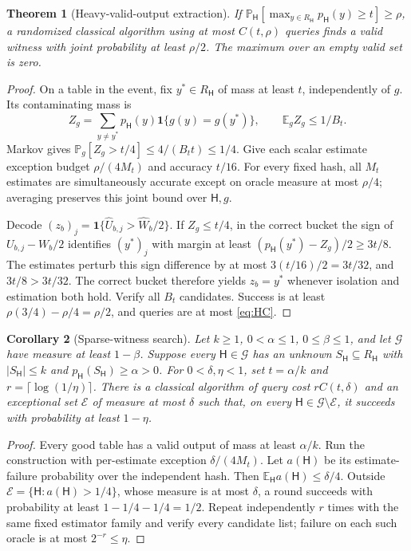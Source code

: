 \documentclass[11pt]{article}
\newtheorem{theorem}{Theorem}[section]
\newtheorem{corollary}[theorem]{Corollary}
\theoremstyle{definition}\newtheorem{definition}[theorem]{Definition}
\theoremstyle{remark}\newtheorem{remark}[theorem]{Remark}
\newcommand{\E}{\mathbb E}\newcommand{\Prb}{\mathbb P}
\newcommand{\mc}{\mathcal}\newcommand{\eps}{\varepsilon}
\begin{document}
\begin{theorem}[Heavy-valid-output extraction]\label{heavy}
If \(\Prb_{\mathsf H}[\max_{y\in R_{\mathsf H}}p_{\mathsf H}(y)\ge t]\ge\rho\), a randomized classical algorithm using at most \(C(t,\rho)\) queries finds a valid witness with joint probability at least \(\rho/2\). The maximum over an empty valid set is zero.
\end{theorem}
\begin{proof}
On a table in the event, fix \(y^*\in R_{\mathsf H}\) of mass at least \(t\), independently of \(g\). Its contaminating mass is
\[
 Z_g=\sum_{y\ne y^*}p_{\mathsf H}(y)\mathbf 1\{g(y)=g(y^*)\},\qquad\E_gZ_g\le1/B_t.
\]
Markov gives \(\Prb_g[Z_g>t/4]\le4/(B_tt)\le1/4\). Give each scalar estimate exception budget \(\rho/(4M_t)\) and accuracy \(t/16\). For every fixed hash, all \(M_t\) estimates are simultaneously accurate except on oracle measure at most \(\rho/4\); averaging preserves this joint bound over \(\mathsf H,g\).

Decode \((z_b)_j=\mathbf 1\{\widehat U_{b,j}>\widehat W_b/2\}\). If \(Z_g\le t/4\), in the correct bucket the sign of \(U_{b,j}-W_b/2\) identifies \((y^*)_j\) with margin at least \((p_{\mathsf H}(y^*)-Z_g)/2\ge3t/8\). The estimates perturb this sign difference by at most \(3(t/16)/2=3t/32\), and \(3t/8>3t/32\). The correct bucket therefore yields \(z_b=y^*\) whenever isolation and estimation both hold. Verify all \(B_t\) candidates. Success is at least \(\rho(3/4)-\rho/4=\rho/2\), and queries are at most \eqref{eq:HC}.
\end{proof}

\begin{corollary}[Sparse-witness search]
Let \(k\ge1\), \(0<\alpha\le1\), \(0\le\beta\le1\), and let \(\mc G\) have measure at least \(1-\beta\). Suppose every \(\mathsf H\in\mc G\) has an unknown \(S_{\mathsf H}\subseteq R_{\mathsf H}\) with \(|S_{\mathsf H}|\le k\) and \(p_{\mathsf H}(S_{\mathsf H})\ge\alpha>0\). For \(0<\delta,\eta<1\), set \(t=\alpha/k\) and \(r=\lceil\log(1/\eta)\rceil\). There is a classical algorithm of query cost \(rC(t,\delta)\) and an exceptional set \(\mc E\) of measure at most \(\delta\) such that, on every \(\mathsf H\in\mc G\setminus\mc E\), it succeeds with probability at least \(1-\eta\).
\end{corollary}
\begin{proof}
Every good table has a valid output of mass at least \(\alpha/k\). Run the construction with per-estimate exception \(\delta/(4M_t)\). Let \(a(\mathsf H)\) be its estimate-failure probability over the independent hash. Then \(\E_{\mathsf H}a(\mathsf H)\le\delta/4\). Outside \(\mc E=\{\mathsf H:a(\mathsf H)>1/4\}\), whose measure is at most \(\delta\), a round succeeds with probability at least \(1-1/4-1/4=1/2\). Repeat independently \(r\) times with the same fixed estimator family and verify every candidate list; failure on each such oracle is at most \(2^{-r}\le\eta\).
\end{proof}
\end{document}
